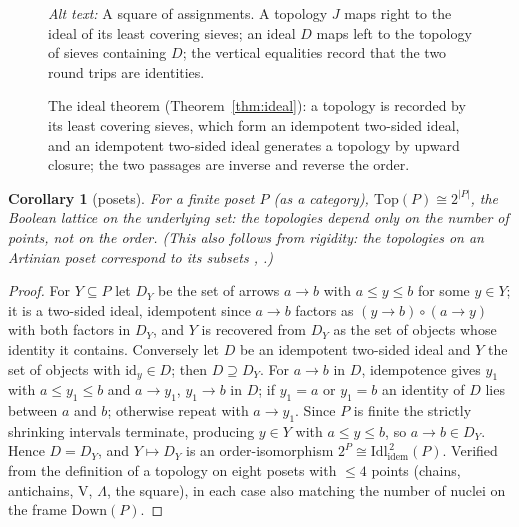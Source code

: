\documentclass[11pt]{amsart}
\newtheorem{cor}[thm]{Corollary}
\theoremstyle{definition}
\newcommand{\Top}{\mathrm{Top}}
\newcommand{\Down}{\mathrm{Down}}
\newcommand{\Idem}{\mathrm{Idl}^{\,2}_{\mathrm{idem}}}
\begin{document}
\begin{figure}[ht]
\centering
{}
\caption{The ideal theorem (Theorem~\ref{thm:ideal}): a topology is recorded
by its least covering sieves, which form an idempotent two-sided ideal, and
an idempotent two-sided ideal generates a topology by upward closure; the two
passages are inverse and reverse the order.}
\label{fig:ideal}
\par\smallskip\noindent\textit{Alt text:} A square of assignments. A
topology $J$ maps right to the ideal of its least covering sieves; an ideal
$D$ maps left to the topology of sieves containing $D$; the vertical
equalities record that the two round trips are identities.
\end{figure}

\begin{cor}[posets]\label{cor:poset}
For a finite poset $P$ (as a category), $\Top(P)\cong 2^{|P|}$, the Boolean
lattice on the underlying set: the topologies depend only on the number of
points, not on the order. (This also follows from rigidity: the topologies on
an Artinian poset correspond to its subsets \cite{Lin14}, \cite{Marques25}.)
\end{cor}
\begin{proof}
For $Y\subseteq P$ let $D_Y$ be the set of arrows $a\to b$ with $a\le y\le b$
for some $y\in Y$; it is a two-sided ideal, idempotent since $a\to b$ factors
as $(y\to b)\circ(a\to y)$ with both factors in $D_Y$, and $Y$ is recovered
from $D_Y$ as the set of objects whose identity it contains. Conversely let
$D$ be an idempotent two-sided ideal and $Y$ the set of objects with
$\mathrm{id}_y\in D$; then $D\supseteq D_Y$. For $a\to b$ in $D$, idempotence
gives $y_1$ with $a\le y_1\le b$ and $a\to y_1$, $y_1\to b$ in $D$; if $y_1=a$
or $y_1=b$ an identity of $D$ lies between $a$ and $b$; otherwise repeat with
$a\to y_1$. Since $P$ is finite the strictly shrinking intervals terminate,
producing $y\in Y$ with $a\le y\le b$, so $a\to b\in D_Y$. Hence $D=D_Y$, and
$Y\mapsto D_Y$ is an order-isomorphism $2^P\cong\Idem(P)$. Verified from the
definition of a topology on eight posets with $\le4$ points (chains,
antichains, $\mathrm{V}$, $\Lambda$, the square), in each case also matching
the number of nuclei on the frame $\Down(P)$.
\end{proof}
\end{document}

